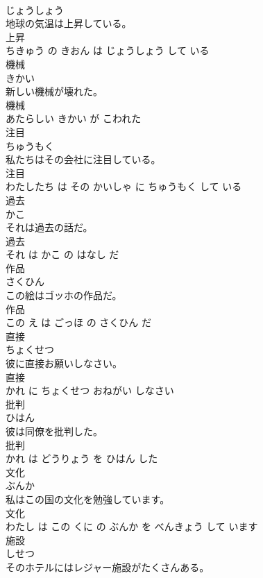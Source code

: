 \documentclass[8pt]{extreport}
\begin{document}
\begin{CJK}{UTF8}{min}
\\	じょうしょう			
\\	地球の気温は上昇している。	
\\	上昇 
\\	ちきゅう の きおん は じょうしょう して いる			
\\	機械	
\\	きかい			
\\	新しい機械が壊れた。	
\\	機械 
\\	あたらしい きかい が こわれた			
\\	注目	
\\	ちゅうもく			
\\	私たちはその会社に注目している。	
\\	注目 
\\	わたしたち は その かいしゃ に ちゅうもく して いる			
\\	過去	
\\	かこ			
\\	それは過去の話だ。	
\\	過去 
\\	それ は かこ の はなし だ			
\\	作品	
\\	さくひん			
\\	この絵はゴッホの作品だ。	
\\	作品 
\\	この え は ごっほ の さくひん だ			
\\	直接	
\\	ちょくせつ			
\\	彼に直接お願いしなさい。	
\\	直接 
\\	かれ に ちょくせつ おねがい しなさい			
\\	批判	
\\	ひはん			
\\	彼は同僚を批判した。	
\\	批判 
\\	かれ は どうりょう を ひはん した			
\\	文化	
\\	ぶんか			
\\	私はこの国の文化を勉強しています。	
\\	文化 
\\	わたし は この くに の ぶんか を べんきょう して います			
\\	施設	
\\	しせつ			
\\	そのホテルにはレジャー施設がたくさんある。	

\end{CJK}
\end{document}
